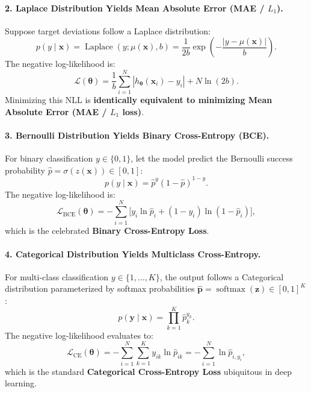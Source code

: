 \paragraph{2. Laplace Distribution Yields Mean Absolute Error (MAE / $L_1$).}
Suppose target deviations follow a Laplace distribution:
\begin{equation}
p(y \mid \mathbf{x}) = \operatorname{Laplace}(y; \mu(\mathbf{x}), b) = \frac{1}{2b} \exp\left( -\frac{|y - \mu(\mathbf{x})|}{b} \right).
\end{equation}
The negative log-likelihood is:
\begin{equation}
\mathcal{L}(\boldsymbol{\theta}) = \frac{1}{b} \sum_{i=1}^N |h_{\boldsymbol{\theta}}(\mathbf{x}_i) - y_i| + N \ln(2b).
\end{equation}
Minimizing this NLL is \textbf{identically equivalent to minimizing Mean Absolute Error (MAE / $L_1$ loss)}.

\paragraph{3. Bernoulli Distribution Yields Binary Cross-Entropy (BCE).}
For binary classification $y \in \{0, 1\}$, let the model predict the Bernoulli success probability $\hat{p} = \sigma(z(\mathbf{x})) \in [0, 1]$:
\begin{equation}
p(y \mid \mathbf{x}) = \hat{p}^y (1 - \hat{p})^{1 - y}.
\end{equation}
The negative log-likelihood is:
\begin{equation}
\mathcal{L}_{\text{BCE}}(\boldsymbol{\theta}) = -\sum_{i=1}^N \Big[ y_i \ln \hat{p}_i + (1 - y_i) \ln(1 - \hat{p}_i) \Big],
\end{equation}
which is the celebrated \textbf{Binary Cross-Entropy Loss}.

\paragraph{4. Categorical Distribution Yields Multiclass Cross-Entropy.}
For multi-class classification $y \in \{1, \dots, K\}$, the output follows a Categorical distribution parameterized by softmax probabilities $\hat{\mathbf{p}} = \operatorname{softmax}(\mathbf{z}) \in [0, 1]^K$:
\begin{equation}
p(\mathbf{y} \mid \mathbf{x}) = \prod_{k=1}^K \hat{p}_k^{y_k}.
\end{equation}
The negative log-likelihood evaluates to:
\begin{equation}
\mathcal{L}_{\text{CE}}(\boldsymbol{\theta}) = -\sum_{i=1}^N \sum_{k=1}^K y_{ik} \ln \hat{p}_{ik} = -\sum_{i=1}^N \ln \hat{p}_{i, y_i},
\end{equation}
which is the standard \textbf{Categorical Cross-Entropy Loss} ubiquitous in deep learning.

